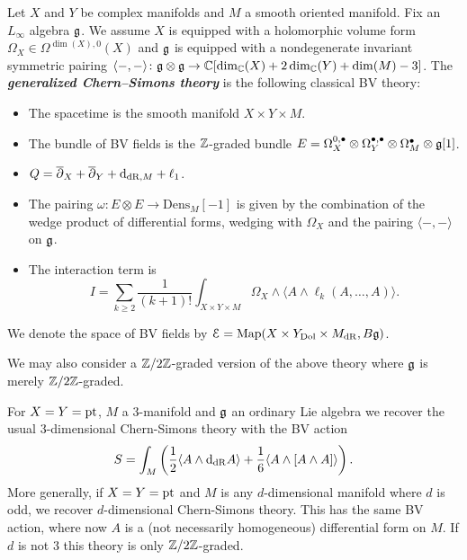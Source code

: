 \documentclass[10pt, oneside]{article}
\newcommand{\Dens}{\mathrm{Dens}}
\newcommand{\defterm}[1]{\textbf{\emph{#1}}}
\begin{document}
\begin{definition}
Let $X$ and $Y$ be complex manifolds and $M$ a smooth oriented manifold. Fix an $L_\infty$ algebra $\mathfrak g$. We assume $X$ is equipped with a holomorphic volume form $\Omega_X \in\Omega^{\dim(X), 0}(X)$ and $\mathfrak g$ is equipped with a nondegenerate invariant symmetric pairing $\langle-, -\rangle\colon \mathfrak g\otimes\mathfrak g\rightarrow \mathbb C[\dim_\mathbb C(X) + 2\dim_\mathbb C(Y) + \dim(M) - 3]$. The \defterm{generalized Chern--Simons theory} is the following classical BV theory:
\begin{itemize}
\item The spacetime is the smooth manifold $X\times Y\times M$.

\item The bundle of BV fields is the $\mathbb Z$-graded bundle $E = \Omega^{0,\bullet}_X \otimes \Omega^{\bullet,\bullet}_Y \otimes \Omega^\bullet_M \otimes \mathfrak g[1]$.

\item $Q = \overline{\partial}_X + \overline{\partial}_Y + {\rm d}_{\mathrm{dR}, M} + \ell_1$.

\item The pairing $\omega\colon E\otimes E\rightarrow \Dens_M[-1]$ is given by the combination of the wedge product of differential forms, wedging with $\Omega_X$ and the pairing $\langle -, -\rangle$ on $\mathfrak g$.

\item The interaction term is
\[I = \sum_{k\geq 2}\frac{1}{(k+1)!} \int_{X\times Y\times M} \Omega_X\wedge \langle A\wedge \ell_k(A, \dots, A)\rangle.\]
\end{itemize}
We denote the space of BV fields by $\mathcal E = \operatorname{Map}(X\times Y_{\mathrm{Dol}}\times M_{\mathrm{dR}}, B \mathfrak g)$.
\label{def:generalizedCS}
\end{definition}

We may also consider a $\mathbb Z/2\mathbb Z$-graded version of the above theory where $\mathfrak g$ is merely $\mathbb Z/2\mathbb Z$-graded.

\begin{example}
For $X=Y=\operatorname{pt}$, $M$ a 3-manifold and $\mathfrak g$ an ordinary Lie algebra we recover the usual 3-dimensional Chern-Simons theory with the BV action
\[S = \int_M \left(\frac{1}{2}\langle A\wedge {\rm d}_{\mathrm{dR}} A\rangle + \frac{1}{6}\langle A\wedge [A\wedge A]\rangle\right).\]
More generally, if $X=Y=\operatorname{pt}$ and $M$ is any $d$-dimensional manifold where $d$ is odd, we recover $d$-dimensional Chern-Simons theory.  This has the same BV action, where now $A$ is a (not necessarily homogeneous) differential form on $M$.  If $d$ is not 3 this theory is only $\mathbb Z/2\mathbb Z$-graded.
\end{example}
\end{document}
